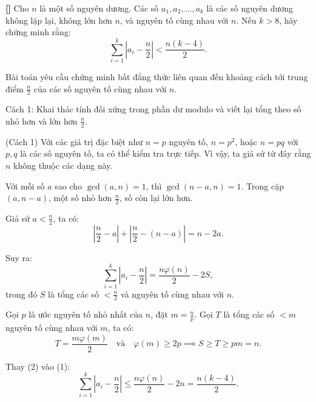 \documentclass[../01-divisibility.tex]{subfiles}
\begin{document}
\begin{example*}\label{example:KOR-2015-MO-P8}\textbf{[]}
	Cho \( n \) là một số nguyên dương. Các số \( a_1, a_2, \dots, a_k \) là các số nguyên dương không lặp lại, không lớn hơn \( n \),
	và nguyên tố cùng nhau với \( n \). Nếu \( k > 8 \), hãy chứng minh rằng:
	\[
		\sum_{i=1}^k \left| a_i - \frac{n}{2} \right| < \frac{n(k - 4)}{2}.
	\]
\end{example*}

\begin{story*}
	Bài toán yêu cầu chứng minh bất đẳng thức liên quan đến khoảng cách tới trung điểm \( \frac{n}{2} \) của các số nguyên tố cùng nhau với \( n \).

	Cách 1: Khai thác tính đối xứng trong phần dư modulo và viết lại tổng theo số nhỏ hơn và lớn hơn \( \frac{n}{2} \).
\end{story*}

\bigbreak

\begin{soln}(Cách 1)\footnotemark
	Với các giá trị đặc biệt như \( n = p \) nguyên tố, \( n = p^2 \), hoặc \( n = pq \) với \( p, q \) là các số nguyên tố, ta có thể kiểm tra trực tiếp.
	Vì vậy, ta giả sử từ đây rằng \( n \) không thuộc các dạng này.

	Với mỗi số \( a \) sao cho \( \gcd(a, n) = 1 \), thì \( \gcd(n - a, n) = 1 \). Trong cặp \( (a, n - a) \), một số nhỏ hơn \( \frac{n}{2} \), số còn lại lớn hơn.

	Giả sử \( a < \frac{n}{2} \), ta có:
	\[
		\left| \frac{n}{2} - a \right| + \left| \frac{n}{2} - (n - a) \right| = n - 2a.
	\]

	Suy ra:
	\[
		\sum_{i=1}^k \left| a_i - \frac{n}{2} \right| = \frac{n\varphi(n)}{2} - 2S, \tag{1}
	\]
	trong đó \( S \) là tổng các số \( < \frac{n}{2} \) và nguyên tố cùng nhau với \( n \).

	Gọi \( p \) là ước nguyên tố nhỏ nhất của \( n \), đặt \( m = \frac{n}{p} \). Gọi \( T \) là tổng các số \( < m \) nguyên tố cùng nhau với \( m \), ta có:
	\[
		T = \frac{m\varphi(m)}{2} \quad \text{và} \quad \varphi(m) \ge 2p \implies S \ge T \ge pm = n. \tag{2}
	\]

	Thay (2) vào (1):
	\[
		\sum_{i=1}^k \left| a_i - \frac{n}{2} \right| \le \frac{n\varphi(n)}{2} - 2n = \frac{n(k - 4)}{2}.
	\]
\end{soln}

\end{document}
